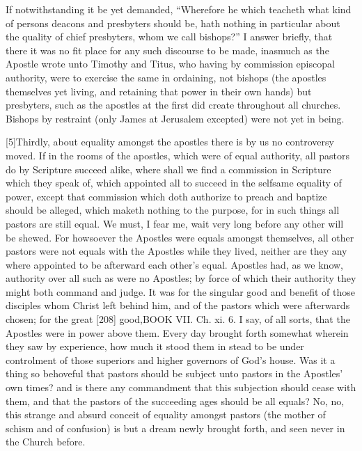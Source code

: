 If notwithstanding it be yet demanded, “Wherefore he which teacheth what kind of persons deacons and presbyters should be, hath nothing in particular about the quality of chief presbyters, whom we call bishops?” I answer briefly, that there it was no fit place for any such discourse to be made, inasmuch as the Apostle wrote unto Timothy and Titus, who having by commission episcopal authority, were to exercise the same in ordaining, not bishops (the apostles themselves yet living, and retaining that power in their own hands) but presbyters, such as the apostles at the first did create throughout all churches. Bishops by restraint (only James at Jerusalem excepted) were not yet in being.

[5]Thirdly, about equality amongst the apostles there is by us no controversy moved. If in the rooms of the apostles, which were of equal authority, all pastors do by Scripture succeed alike, where shall we find a commission in Scripture which they speak of, which appointed all to succeed in the selfsame equality of power, except that commission which doth authorize to preach and baptize should be alleged, which maketh nothing to the purpose, for in such things all pastors are still equal. We must, I fear me, wait very long before any other will be shewed. For howsoever the Apostles were equals amongst themselves, all other pastors were not equals with the Apostles while they lived, neither are they any where appointed to be afterward each other’s equal. Apostles had, as we know, authority over all such as were no Apostles; by force of which their authority they might both command and judge. It was for the singular good and benefit of those disciples whom Christ left behind him, and of the pastors which were afterwards chosen; for the great [208] good,BOOK VII. Ch. xi. 6. I say, of all sorts, that the Apostles were in power above them. Every day brought forth somewhat wherein they saw by experience, how much it stood them in stead to be under controlment of those superiors and higher governors of God’s house. Was it a thing so behoveful that pastors should be subject unto pastors in the Apostles’ own times? and is there any commandment that this subjection should cease with them, and that the pastors of the succeeding ages should be all equals? No, no, this strange and absurd conceit of equality amongst pastors (the mother of schism and of confusion) is but a dream newly brought forth, and seen never in the Church before.

